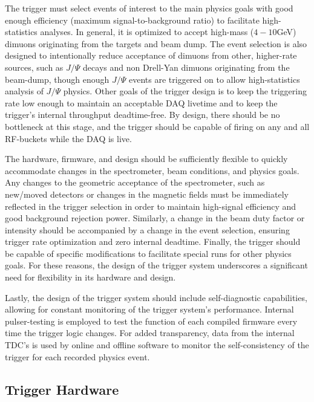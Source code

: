 The trigger must select events of interest to the main physics goals with good enough efficiency (maximum signal-to-background ratio) to facilitate high-statistics analyses. In general, it is optimized to accept high-mass ($4-10$GeV) dimuons originating from the targets and beam dump. The event selection is also designed to intentionally reduce acceptance of dimuons from other, higher-rate sources, such as $J/\Psi$ decays and non Drell-Yan dimuons originating from the beam-dump, though enough $J/\Psi$ events are triggered on to allow high-statistics analysis of $J/\Psi$ physics. Other goals of the trigger design is to keep the triggering rate low enough to maintain an acceptable DAQ livetime and to keep the trigger's internal throughput deadtime-free. By design, there should be no bottleneck at this stage, and the trigger should be capable of firing on any and all RF-buckets while the DAQ is live.

The hardware, firmware, and design should be sufficiently flexible to quickly accommodate changes in the spectrometer, beam conditions, and physics goals. Any changes to the geometric acceptance of the spectrometer, such as new/moved detectors or changes in the magnetic fields must be immediately reflected in the trigger selection in order to maintain high-signal efficiency and good background rejection power. Similarly, a change in the beam duty factor or intensity should be accompanied by a change in the event selection, ensuring trigger rate optimization and zero internal deadtime. Finally, the trigger should be capable of specific modifications to facilitate special runs for other physics goals. For these reasons, the design of the trigger system underscores a significant need for flexibility in its hardware and design.

Lastly, the design of the trigger system should include self-diagnostic capabilities, allowing for constant monitoring of the trigger system's performance. Internal pulser-testing is employed to test the function of each compiled firmware every time the trigger logic changes. For added transparency, data from the internal TDC's is used by online and offline software to monitor the self-consistency of the trigger for each recorded physics event.

\subsection{Trigger Hardware}

